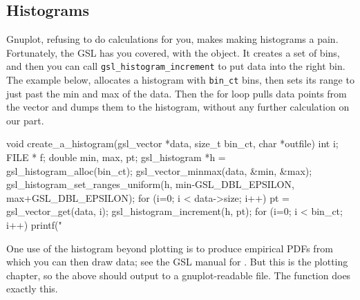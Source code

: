 \subsection{Histograms} Gnuplot, refusing to do calculations for you,
makes making histograms a pain.  Fortunately, the GSL has you covered,
with the  object. It creates a set of bins, and
then you can call {\tt gsl\_\-hist\-o\-gram\_\-in\-cre\-ment} to put
data into the right bin. The example below, allocates a histogram with
{\tt bin\_\-ct} bins, then sets its range to just past the min and max
of the data. Then the for loop pulls data points from the vector and
dumps them to the histogram, without any further calculation on our part.

void create_a_histogram(gsl_vector *data, size_t bin_ct, char *outfile){
int             i;
FILE *          f;
double      min, max, pt;
gsl_histogram   *h      = gsl_histogram_alloc(bin_ct);
    gsl_vector_minmax(data, &min, &max);
    gsl_histogram_set_ranges_uniform(h, min-GSL_DBL_EPSILON, 
                                            max+GSL_DBL_EPSILON);
    for (i=0; i < data->size; i++){
        pt  = gsl_vector_get(data, i);
        gsl_histogram_increment(h, pt);
        }
    for (i=0; i < bin_ct; i++)
        printf("%
}

One use of the histogram beyond plotting is to produce empirical
PDFs from which you can then draw data; see the GSL manual for
. But this is the plotting chapter,
so the above should output to a gnuplot-readable file. The
 function does exactly this.

